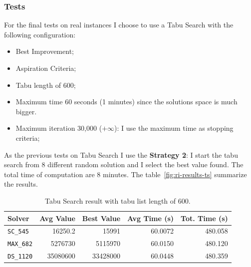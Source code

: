 	\subsubsection{Tests}
		
		For the final tests on real instances I choose to use a Tabu Search with the following configuration:
		\begin{itemize}
			\item Best Improvement;
			\item Aspiration Criteria;
			\item Tabu length of 600;
			\item Maximum time 60 seconds (1 minutes) since the solutions space is much bigger.
			\item Maximum iteration 30,000 ($+\infty$): I use the maximum time as stopping criteria;
		\end{itemize}
		As the previous tests on Tabu Search I use the \textbf{Strategy 2}: I start the tabu search from 8 different random solution and I select the best value found. The total time of computation are 8 minutes. The table~\ref{fig:ri-results-ts} summarize the results.
		
		\begin{table}[hb]
			\centering
			\begin{tabular}{lrrrr}
				\toprule
				\textbf{Solver} & \textbf{Avg Value} & \textbf{Best Value} & \textbf{Avg Time (s)} & \textbf{Tot. Time (s)} \\
				\toprule
				\verb|SC_545|         & 16250.2            & 15991               & 60.0072               & 480.058                \\
				\verb|MAX_682|        & 5276730            & 5115970             & 60.0150               & 480.120                \\
				\verb|DS_1120|        & 35080600           & 33428000            & 60.0448               & 480.359    \\
				\bottomrule           
			\end{tabular}
			\caption{Tabu Search result with tabu list length of 600.}
			\label{tab:ri-results-ts}
		\end{table}
	
